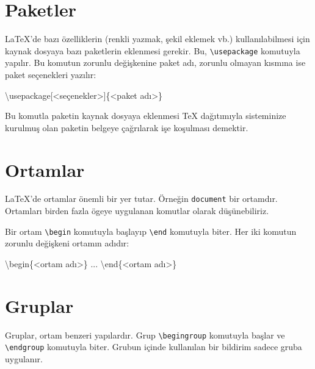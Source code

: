 \documentclass[
  10pt,
]{scrbook}
\newenvironment{Shaded}{\begin{snugshade}}{\end{snugshade}}
\newcommand{\NormalTok}[1]{#1}
\begin{document}
\hypertarget{paketler}{%
\section{Paketler}\label{paketler}}

LaTeX'de bazı özelliklerin (renkli yazmak, şekil eklemek vb.)
kullanılabilmesi için kaynak dosyaya bazı paketlerin eklenmesi gerekir.
Bu, \texttt{\textbackslash{}usepackage} komutuyla yapılır. Bu komutun zorunlu değişkenine
paket adı, zorunlu olmayan kısmına ise paket seçenekleri yazılır:

\begin{Shaded}
\begin{Highlighting}[]
\NormalTok{\textbackslash{}usepackage[\textless{}seçenekler\textgreater{}]\{\textless{}paket adı\textgreater{}\}}
\end{Highlighting}
\end{Shaded}

Bu komutla paketin kaynak dosyaya eklenmesi TeX dağıtımıyla sisteminize
kurulmuş olan paketin belgeye çağrılarak işe koşulması demektir.

\hypertarget{ortamlar}{%
\section{Ortamlar}\label{ortamlar}}

LaTeX'de ortamlar önemli bir yer tutar. Örneğin \texttt{document} bir ortamdır.
Ortamları birden fazla ögeye uygulanan komutlar olarak düşünebiliriz.

Bir ortam \texttt{\textbackslash{}begin} komutuyla başlayıp \texttt{\textbackslash{}end} komutuyla biter. Her iki
komutun zorunlu değişkeni ortamın adıdır:

\begin{Shaded}
\begin{Highlighting}[]
\NormalTok{\textbackslash{}begin\{\textless{}ortam adı\textgreater{}\}}
\NormalTok{ ...}
\NormalTok{\textbackslash{}end\{\textless{}ortam adı\textgreater{}\}}
\end{Highlighting}
\end{Shaded}

\hypertarget{gruplar}{%
\section{Gruplar}\label{gruplar}}

Gruplar, ortam benzeri yapılardır. Grup \texttt{\textbackslash{}begingroup} komutuyla başlar
ve \texttt{\textbackslash{}endgroup} komutuyla biter. Grubun içinde kullanılan bir bildirim
sadece gruba uygulanır.
\end{document}
